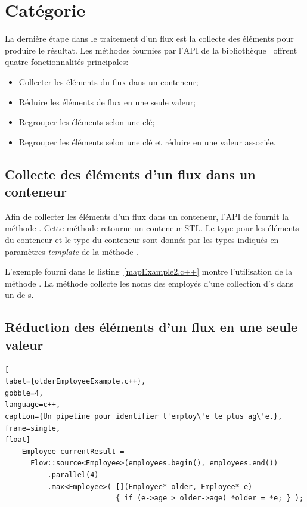 \section{Cat\'egorie }

\label{agregation.sect}

La derni\`ere \'etape dans le traitement d'un flux est la collecte des \'el\'ements pour produire le r\'esultat. Les m\'ethodes fournies par l'API de la biblioth\`eque \ppff\ offrent quatre fonctionnalit\'es principales: 


\begin{itemize}
	\item Collecter les \'el\'ements du flux dans un conteneur;	

	\item R\'eduire les \'el\'ements de flux en une seule valeur;

	\item Regrouper les \'el\'ements selon une cl\'e;
	
	\item Regrouper les \'el\'ements selon une cl\'e et r\'eduire en une valeur associ\'ee.
\end{itemize}


\subsection{Collecte des \'el\'ements d'un flux dans un conteneur}

Afin de collecter les \'el\'ements d'un flux dans un conteneur, l'{API} de  fournit la m\'ethode . Cette m\'ethode retourne un conteneur {STL}. Le type pour les \'el\'ements du conteneur et le type du conteneur sont donn\'es par les types indiqu\'es en param\`etres \emph{template} de la m\'ethode . 

L'exemple fourni dans le listing~\ref{mapExample2.c++} montre l'utilisation de la m\'ethode . La m\'ethode collecte les noms des employ\'es d'une collection d's dans un  de s.


\subsection{R\'eduction des \'el\'ements d'un flux en une seule valeur}


\begin{lstlisting}[
label={olderEmployeeExample.c++},
gobble=4,
language=c++,
caption={Un pipeline pour identifier l'employ\'e le plus ag\'e.},
frame=single,
float]
    Employee currentResult = 
      Flow::source<Employee>(employees.begin(), employees.end())
          .parallel(4)
          .max<Employee>( [](Employee* older, Employee* e) 
                          { if (e->age > older->age) *older = *e; } );
\end{lstlisting}


